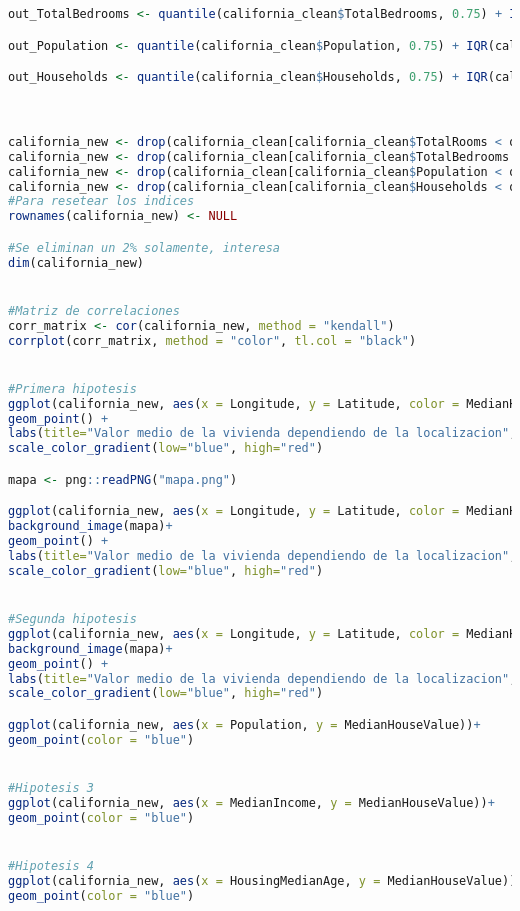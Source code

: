 \begin{lstlisting}[language=R]
out_TotalBedrooms <- quantile(california_clean$TotalBedrooms, 0.75) + IQR(california_clean$TotalBedrooms)*1.5

out_Population <- quantile(california_clean$Population, 0.75) + IQR(california_clean$Population)*1.5

out_Households <- quantile(california_clean$Households, 0.75) + IQR(california_clean$Households)*1.5



california_new <- drop(california_clean[california_clean$TotalRooms < out_TotalRooms ,])
california_new <- drop(california_clean[california_clean$TotalBedrooms < out_TotalBedrooms ,])
california_new <- drop(california_clean[california_clean$Population < out_Population ,])
california_new <- drop(california_clean[california_clean$Households < out_Households ,])
#Para resetear los indices
rownames(california_new) <- NULL

#Se eliminan un 2% solamente, interesa
dim(california_new)


#Matriz de correlaciones
corr_matrix <- cor(california_new, method = "kendall")
corrplot(corr_matrix, method = "color", tl.col = "black")


#Primera hipotesis
ggplot(california_new, aes(x = Longitude, y = Latitude, color = MedianHouseValue, hue = MedianHouseValue))+
geom_point() +
labs(title="Valor medio de la vivienda dependiendo de la localizacion", color="MedianHouseValue") +
scale_color_gradient(low="blue", high="red")

mapa <- png::readPNG("mapa.png")

ggplot(california_new, aes(x = Longitude, y = Latitude, color = MedianHouseValue, hue = MedianHouseValue))+
background_image(mapa)+
geom_point() +
labs(title="Valor medio de la vivienda dependiendo de la localizacion", color="MedianHouseValue") +
scale_color_gradient(low="blue", high="red")


#Segunda hipotesis
ggplot(california_new, aes(x = Longitude, y = Latitude, color = MedianHouseValue, size = Population))+
background_image(mapa)+
geom_point() +
labs(title="Valor medio de la vivienda dependiendo de la localizacion", color="MedianHouseValue") +
scale_color_gradient(low="blue", high="red")

ggplot(california_new, aes(x = Population, y = MedianHouseValue))+
geom_point(color = "blue") 


#Hipotesis 3
ggplot(california_new, aes(x = MedianIncome, y = MedianHouseValue))+
geom_point(color = "blue") 


#Hipotesis 4
ggplot(california_new, aes(x = HousingMedianAge, y = MedianHouseValue))+
geom_point(color = "blue") 


\end{lstlisting}
